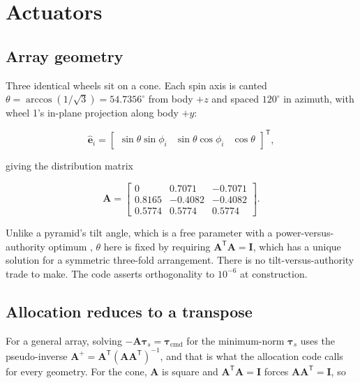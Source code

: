 \documentclass[conference,10pt,a4paper]{IEEEtran}
\newcommand{\vect}[1]{\bm{#1}}
\newcommand{\mat}[1]{\bm{#1}}
\newcommand{\T}{^{\mathsf{T}}}
\newcommand{\pinv}{^{+}}
\begin{document}
\section{Actuators}
\label{sec:actuators}

\subsection{Array geometry}

Three identical wheels sit on a cone. Each spin axis is canted
$\theta=\arccos(1/\sqrt{3})=54.7356^\circ$ from body $+z$ and spaced
$120^\circ$ in azimuth, with wheel 1's in-plane projection along body $+y$:

\begin{equation}
\hat{\vect{e}}_i = \begin{bmatrix}
\sin\theta\sin\phi_i & \sin\theta\cos\phi_i & \cos\theta\end{bmatrix}\T,
\label{eq:Amatrix}
\end{equation}

giving the distribution matrix

\begin{equation}
\mat{A} =
\begin{bmatrix}
0 & 0.7071 & -0.7071\\
0.8165 & -0.4082 & -0.4082\\
0.5774 & 0.5774 & 0.5774
\end{bmatrix}.
\label{eq:Amatrix_num}
\end{equation}

Unlike a pyramid's tilt angle, which is a free parameter with a
power-versus-authority optimum \cite{shirazi2014}, $\theta$ here is fixed by
requiring $\mat{A}\T\mat{A}=\mat{I}$, which has a unique solution for a
symmetric three-fold arrangement. There is no tilt-versus-authority trade to
make. The code asserts orthogonality to $10^{-6}$ at construction.

\subsection{Allocation reduces to a transpose}

For a general array, solving $-\mat{A}\vect{\tau}_s=\vect{\tau}_\text{cmd}$ for
the minimum-norm $\vect{\tau}_s$ uses the pseudo-inverse
$\mat{A}\pinv=\mat{A}\T(\mat{A}\mat{A}\T)^{-1}$, and that is what the
allocation code calls for every geometry. For the cone, $\mat{A}$ is square
and $\mat{A}\T\mat{A}=\mat{I}$ forces $\mat{A}\mat{A}\T=\mat{I}$, so
\end{document}
